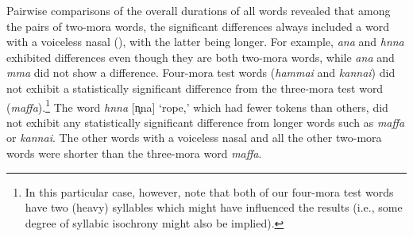 \documentclass[output=paper]{langscibook}
\begin{document}
Pairwise comparisons of the overall durations of all words revealed that among the pairs of two-mora words, the significant differences always included a word with a voiceless nasal (), with the latter being longer. For example, \textit{ana} and \textit{hnna} exhibited differences even though they are both two-mora words, while \textit{ana} and \textit{mma} did not show a difference. Four-mora test words (\textit{hammai} and \textit{kannai}) did not exhibit a statistically significant difference from the three-mora test word (\textit{maffa}).\footnote{In this particular case, however, note that both of our four-mora test words have two (heavy) syllables which might have influenced the results (i.e., some degree of syllabic isochrony might also be implied).} The word \textit{hnna} [n̥na] ‘rope,’ which had fewer tokens than others, did not exhibit any statistically significant difference from longer words such as \textit{maffa} or \textit{kannai}. The other words with a voiceless nasal and all the other two-mora words were shorter than the three-mora word \textit{maffa}. 
\end{document}
